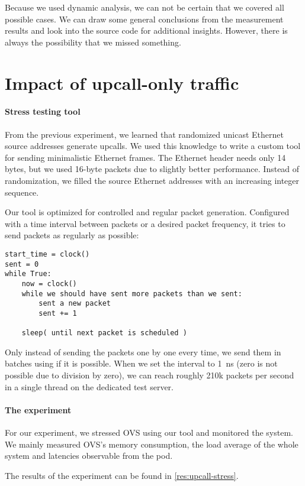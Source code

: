 Because we used dynamic analysis, we can not be certain that we covered all possible cases. We can draw some general conclusions from the measurement results and look into the source code for additional insights. However, there is always the possibility that we missed something.

\section{Impact of upcall-only traffic}
\label{design:upcall-impact}

\paragraph{Stress testing tool}
From the previous experiment, we learned that randomized unicast Ethernet source addresses generate upcalls. We used this knowledge to write a custom tool for sending minimalistic Ethernet frames. The Ethernet header needs only 14 bytes, but we used 16-byte packets due to slightly better performance. Instead of randomization, we filled the source Ethernet addresses with an increasing integer sequence.

Our tool is optimized for controlled and regular packet generation. Configured with a time interval between packets or a desired packet frequency, it tries to send packets as regularly as possible:

\begin{verbatim}
start_time = clock()
sent = 0
while True:
    now = clock()
    while we should have sent more packets than we sent:
        sent a new packet
        sent += 1
    
    sleep( until next packet is scheduled )
\end{verbatim}

Only instead of sending the packets one by one every time, we send them in batches using  if it is possible. When we set the interval to \qty{1}{\ns} (zero is not possible due to division by zero), we can reach roughly 210k packets per second in a single thread on the dedicated test server.

\paragraph{The experiment}
For our experiment, we stressed OVS using our tool and monitored the system. We mainly measured OVS's memory consumption, the load average of the whole system and latencies observable from the  pod.

The results of the experiment can be found in \cref{res:upcall-stress}.
